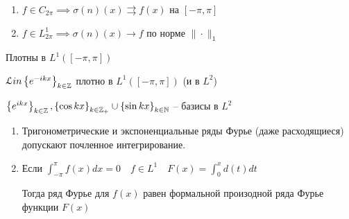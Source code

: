 \begin{theorem}
    \begin{enumerate}
        \item $f\in C_{2\pi} \implies \sigma(n)(x) \rightrightarrows f(x)$ на $[-\pi, \pi]$
        \item $f\in L^1_{2\pi} \implies \sigma(n)(x)\to f$ по норме $\|\cdot \|_1$
    \end{enumerate}
\end{theorem}
\begin{corollary}

    Плотны в $L^1(\left[ -\pi, \pi \right] )$

    $\mathcal Lin \left\{ e^{-ikx} \right\} _{k\in \mathbb{Z} }$ плотно в $L^1\left( \left[ -\pi, \pi \right]  \right) $ (и в $L^2$)
\end{corollary}

\begin{corollary}
    $\left\{ e^{ikx} \right\}_{k\in \mathbb{Z} }, \left\{ \cos kx \right\} _{k\in \mathbb{Z}_+} \cup \left\{ \sin kx \right\} _{k\in \mathbb{N} }$ -- базисы в $L^2$
\end{corollary}

\begin{statement}
    \begin{enumerate}
        \item Тригонометрические и экспоненциальные ряды Фурье (даже расходящиеся) допускают почленное интегрирование.
        \item Если $\int_{-\pi}^\pi f(x)dx = 0\quad f\in L^1\quad F(x) = \int_0^x d(t)dt$

            Тогда ряд Фурье для $f(x)$ равен формальной произодной ряда Фурье функции $F(x)$
    \end{enumerate}
\end{statement}
